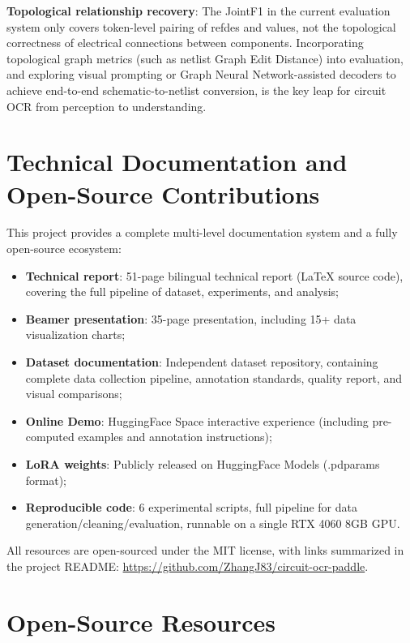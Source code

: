 \textbf{Topological relationship recovery}: The JointF1 in the current evaluation system only covers token-level pairing of refdes and values, not the topological correctness of electrical connections between components. Incorporating topological graph metrics (such as netlist Graph Edit Distance) into evaluation, and exploring visual prompting or Graph Neural Network-assisted decoders to achieve end-to-end schematic-to-netlist conversion, is the key leap for circuit OCR from perception to understanding.

\section{Technical Documentation and Open-Source Contributions}

This project provides a complete multi-level documentation system and a fully open-source ecosystem:

\begin{itemize}[nosep]
    \item \textbf{Technical report}: 51-page bilingual technical report (LaTeX source code), covering the full pipeline of dataset, experiments, and analysis;
    \item \textbf{Beamer presentation}: 35-page presentation, including 15+ data visualization charts;
    \item \textbf{Dataset documentation}: Independent dataset repository, containing complete data collection pipeline, annotation standards, quality report, and visual comparisons;
    \item \textbf{Online Demo}: HuggingFace Space interactive experience (including pre-computed examples and annotation instructions);
    \item \textbf{LoRA weights}: Publicly released on HuggingFace Models (.pdparams format);
    \item \textbf{Reproducible code}: 6 experimental scripts, full pipeline for data generation/cleaning/evaluation, runnable on a single RTX 4060 8GB GPU.
\end{itemize}

All resources are open-sourced under the MIT license, with links summarized in the project README: \url{https://github.com/ZhangJ83/circuit-ocr-paddle}.

\section{Open-Source Resources}

